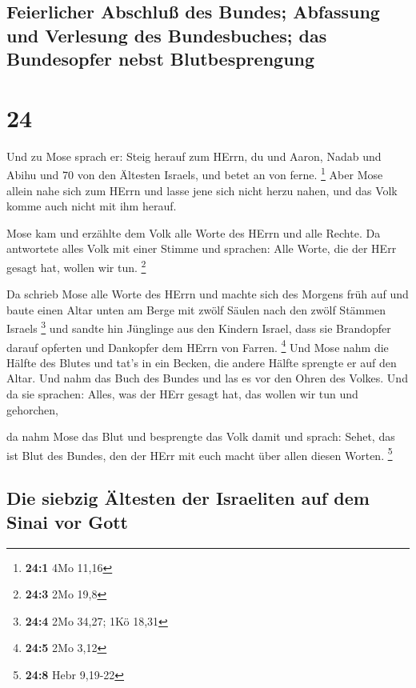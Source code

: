 \hypertarget{feierlicher-abschluuxdf-des-bundes-abfassung-und-verlesung-des-bundesbuches-das-bundesopfer-nebst-blutbesprengung}{%
\subsection{Feierlicher Abschluß des Bundes; Abfassung und Verlesung des
Bundesbuches; das Bundesopfer nebst
Blutbesprengung}\label{feierlicher-abschluuxdf-des-bundes-abfassung-und-verlesung-des-bundesbuches-das-bundesopfer-nebst-blutbesprengung}}

\hypertarget{section-23}{%
\section{24}\label{section-23}}

 Und zu Mose sprach er: Steig herauf zum HErrn, du und
Aaron, Nadab und Abihu und 70 von den Ältesten Israels, und betet an von
ferne. \footnote{\textbf{24:1} 4Mo 11,16}  Aber Mose
allein nahe sich zum HErrn und lasse jene sich nicht herzu nahen, und
das Volk komme auch nicht mit ihm herauf.

 Mose kam und erzählte dem Volk alle Worte des HErrn und
alle Rechte. Da antwortete alles Volk mit einer Stimme und sprachen:
Alle Worte, die der HErr gesagt hat, wollen wir tun. \footnote{\textbf{24:3}
  2Mo 19,8}

 Da schrieb Mose alle Worte des HErrn und machte sich des
Morgens früh auf und baute einen Altar unten am Berge mit zwölf Säulen
nach den zwölf Stämmen Israels \footnote{\textbf{24:4} 2Mo 34,27; 1Kö
  18,31}  und sandte hin Jünglinge aus den Kindern Israel,
dass sie Brandopfer darauf opferten und Dankopfer dem HErrn von Farren.
\footnote{\textbf{24:5} 2Mo 3,12}  Und Mose nahm die
Hälfte des Blutes und tat's in ein Becken, die andere Hälfte sprengte er
auf den Altar.  Und nahm das Buch des Bundes und las es
vor den Ohren des Volkes. Und da sie sprachen: Alles, was der HErr
gesagt hat, das wollen wir tun und gehorchen,

 da nahm Mose das Blut und besprengte das Volk damit und
sprach: Sehet, das ist Blut des Bundes, den der HErr mit euch macht über
allen diesen Worten. \footnote{\textbf{24:8} Hebr 9,19-22}

\hypertarget{die-siebzig-uxe4ltesten-der-israeliten-auf-dem-sinai-vor-gott}{%
\subsection{Die siebzig Ältesten der Israeliten auf dem Sinai vor
Gott}\label{die-siebzig-uxe4ltesten-der-israeliten-auf-dem-sinai-vor-gott}}

